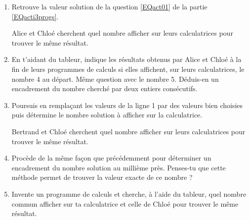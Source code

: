 \begin{activite}
\begin{partie}
\begin{enumerate}
\vspace{1em}

\item Retrouve la valeur solution de la question \ref{EQact01} de la partie \ref{EQacti3progs}.

\vspace{.5em}

Alice et Chloé cherchent quel nombre afficher sur leurs calculatrices pour trouver le même résultat. 

\vspace{.5em}

\item En t'aidant du tableur, indique les résultats obtenus par Alice et Chloé à la fin de leurs programmes de calculs si elles affichent, sur leurs calculatrices, le nombre 4 au départ. Même question avec le nombre 5. Déduis-en un encadrement du nombre cherché par deux entiers consécutifs.
\item Poursuis en remplaçant les valeurs de la ligne 1 par des valeurs bien choisies puis détermine le nombre solution à afficher sur la calculatrice.

\vspace{.5em}

Bertrand et Chloé cherchent quel nombre afficher sur leurs calculatrices pour trouver le même résultat. 

\vspace{.5em}

\item Procède de la même façon que précédemment pour déterminer un encadrement du nombre solution au millième près. Penses-tu que cette méthode permet de trouver la valeur exacte de ce nombre ?
\item Invente un programme de calculs et cherche, à l'aide du tableur, quel nombre commun afficher sur ta calculatrice et celle de Chloé pour trouver le même résultat. 
\end{enumerate}
\end{partie}
\end{activite}






